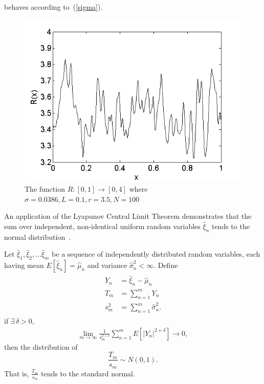 behaves according to~(\ref{sigma}).
\begin{figure}[!h]
\caption[The function $R(x)$]{The function $R:[0,1]\to [0,4]$ where
  $\sigma=0.0386, L=0.1, r=3.5, N=100$}\label{fig:R}
	\begin{center}
		\includegraphics[scale=0.6]{figs/xi.png}
	\end{center}
\end{figure}
An application of the Lyapunov Central Limit Theorem demonstrates that
the sum over independent, non-identical uniform random variables $\hat{\xi}_n$ tends to the normal distribution~\cite{billingsley}.

\begin{singlespacing}
\begin{theorem}\label{clt}
Let $\hat{\xi}_1, \hat{\xi}_2, ...\hat{\xi}_m$ be a sequence of independently distributed random
variables, each having mean $E[\hat{\xi}_n]=\hat{\mu}_n$ and variance
$\hat{\sigma}_n^2 < \infty$. Define
\begin{align*}
\begin{split}
Y_n &=\hat{\xi}_n - \hat{\mu}_n\\
T_m &= \sum_{n=1}^{m}Y_n\\
s_m^2 &=\sum_{n=1}^m\hat{\sigma}_n^2.
\end{split}
\end{align*}
if $\exists\, \delta>0$,
\begin{align*}
\lim_{m\to \infty}\frac{1}{s_m^{2+\delta}}\sum_{n=1}^mE[|Y_n|^{2+\delta}] \to 0,
\end{align*}
then the distribution of
\begin{equation*}
\frac{T_m}{s_m} \sim N(0,1).
\end{equation*}
That is, $\frac{T_m}{s_m}$ tends to the standard normal.
\end{theorem}
\end{singlespacing}

